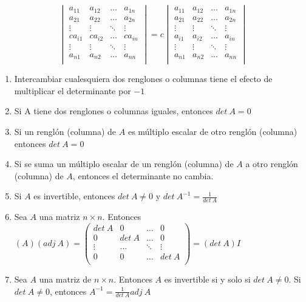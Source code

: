 \documentclass[
]{article}
\begin{document}
\[\begin{vmatrix}
a_{11} & a_{12} & \ldots & a_{1n} \\
a_{21} & a_{22} & \ldots & a_{2n} \\
 \vdots & \vdots & \ddots & \vdots \\
ca_{i1} & ca_{i2} & \ldots & ca_{in} \\
 \vdots & \vdots & \ddots & \vdots \\
a_{n1} & a_{n2} & \ldots & a_{nn} \\
\end{vmatrix} = c\begin{vmatrix}
a_{11} & a_{12} & \ldots & a_{1n} \\
a_{21} & a_{22} & \ldots & a_{2n} \\
 \vdots & \vdots & \ddots & \vdots \\
a_{i1} & a_{i2} & \ldots & a_{in} \\
 \vdots & \vdots & \ddots & \vdots \\
a_{n1} & a_{n2} & \ldots & a_{nn} \\
\end{vmatrix}\]

\begin{enumerate}
\def\labelenumi{\arabic{enumi}.}
\setcounter{enumi}{6}
\item
  Intercambiar cualesquiera dos renglones o columnas tiene el efecto de
  multiplicar el determinante por \(- 1\)
\item
  Si A tiene dos renglones o columnas iguales, entonces \(det\ A = 0\)
\item
  Si un renglón (columna) de \(A\) es múltiplo escalar de otro renglón
  (columna) entonces \(det\ A = 0\)
\item
  Si se suma un múltiplo escalar de un renglón (columna) de \(A\) a otro
  renglón (columna) de \(A\), entonces el determinante no cambia.
\item
  Si \(A\) es invertible, entonces \(det\ A \neq 0\) y
  \(det\ A^{- 1} = \frac{1}{det\ A}\)
\item
  Sea \(A\) una matriz \(n \times n\). Entonces
  \((A)(adj\ A) = \begin{pmatrix}
  det\ A & 0 & \ldots & 0 \\
  0 & det\ A & \ldots & 0 \\
   \vdots & \ldots & \ddots & \vdots \\
  0 & 0 & \ldots & det\ A \\
  \end{pmatrix} = (det\ A)I\)
\item
  Sea \(A\) una matriz de \(n \times n\). Entonces \(A\) es invertible
  si y solo si \(det\ A \neq 0\). Si \(det\ A \neq 0\), entonces
  \(A^{- 1} = \frac{1}{det\ A}adj\ A\)
\end{enumerate}
\end{document}
